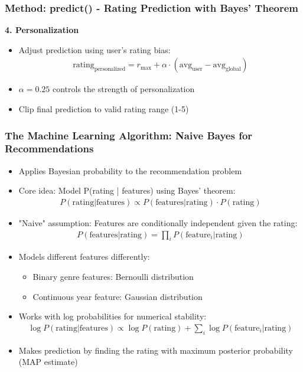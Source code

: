 \documentclass{beamer}
\begin{document}
\begin{frame}
\frametitle{Method: predict() - Rating Prediction with Bayes' Theorem}

    \textbf{4. Personalization}
    \begin{itemize}
        \item Adjust prediction using user's rating bias:
        \begin{align*}
        \text{rating}_{\text{personalized}} = r_{\text{max}} + \alpha \cdot (\text{avg}_{\text{user}} - \text{avg}_{\text{global}})
        \end{align*}
        \item $\alpha = 0.25$ controls the strength of personalization
        \item Clip final prediction to valid rating range (1-5)
    \end{itemize}
\end{frame}

\begin{frame}
\frametitle{The Machine Learning Algorithm: Naive Bayes for Recommendations}

\begin{itemize}
    \item Applies Bayesian probability to the recommendation problem
    \item Core idea: Model P(rating | features) using Bayes' theorem:
    \begin{align*}
    P(\text{rating} | \text{features}) \propto P(\text{features} | \text{rating}) \cdot P(\text{rating})
    \end{align*}
    
    \item "Naive" assumption: Features are conditionally independent given the rating:
    \begin{align*}
    P(\text{features} | \text{rating}) = \prod_i P(\text{feature}_i | \text{rating})
    \end{align*}
    
    \item Models different features differently:
    \begin{itemize}
        \item Binary genre features: Bernoulli distribution
        \item Continuous year feature: Gaussian distribution
    \end{itemize}
    
    \item Works with log probabilities for numerical stability:
    \begin{align*}
    \log P(\text{rating} | \text{features}) \propto \log P(\text{rating}) + \sum_i \log P(\text{feature}_i | \text{rating})
    \end{align*}
    
    \item Makes prediction by finding the rating with maximum posterior probability (MAP estimate)
\end{itemize}
\end{frame}
\end{document}
